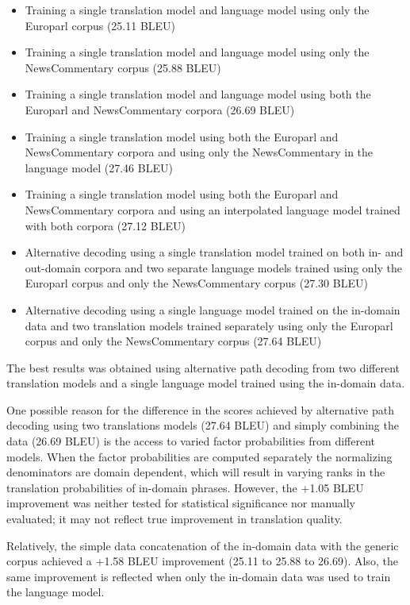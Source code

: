 \begin{itemize}
\item Training a single translation model and language model using only the Europarl corpus (25.11 BLEU)
\item Training a single translation model and language model using only the NewsCommentary corpus (25.88 BLEU)
\item Training a single translation model and language model using both the Europarl and NewsCommentary corpora (26.69 BLEU)
\item Training a single translation model using both the Europarl and NewsCommentary corpora and using only the NewsCommentary in the language model (27.46 BLEU)
\item Training a single translation model using both the Europarl and NewsCommentary corpora and using an interpolated language model trained with both corpora (27.12 BLEU)
\item Alternative decoding using a single translation model trained on both in- and out-domain corpora and two separate language models trained using only the Europarl corpus and only the NewsCommentary corpus (27.30 BLEU)
\item Alternative decoding using a single language model trained on the in-domain data and two translation models trained separately using only the Europarl corpus and only the NewsCommentary corpus (27.64 BLEU)
\end{itemize}

The best results was obtained using alternative path decoding \citep{birch2007ccg} from two different translation models and a single language model trained using the in-domain data. 

One possible reason for the difference in the scores achieved by alternative path decoding using two translations models (27.64 BLEU) and simply combining the data (26.69 BLEU) is the access to varied factor probabilities from different models. When the factor probabilities are computed separately the normalizing denominators are domain dependent, which will result in varying ranks in the translation probabilities of in-domain phrases. However, the +1.05 BLEU improvement was neither tested for statistical significance nor manually evaluated; it may not reflect true improvement in translation quality. 

Relatively, the simple data concatenation of the in-domain data with the generic corpus achieved a +1.58 BLEU improvement (25.11 to 25.88 to 26.69). Also, the same improvement is reflected when only the in-domain data was used to train the language model. 

